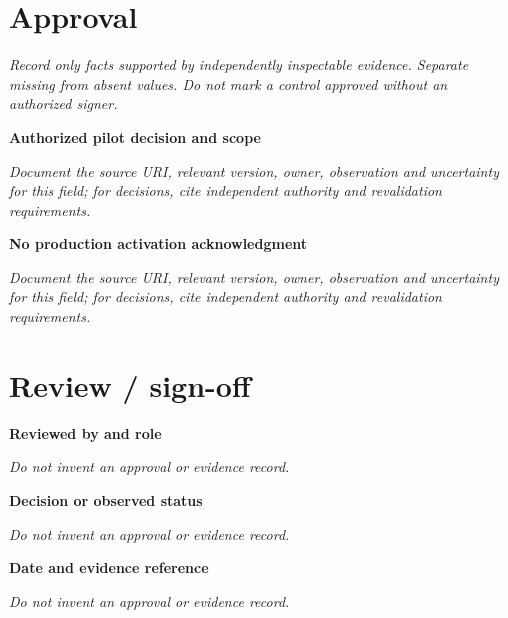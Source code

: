 \documentclass[11pt,letterpaper]{article}
\begin{document}
\section{Approval}
\noindent\emph{Record only facts supported by independently inspectable evidence. Separate missing from absent values. Do not mark a control approved without an authorized signer.}\par
\noindent\textbf{Authorized pilot decision and scope}\par
\noindent\emph{Document the source URI, relevant version, owner, observation and uncertainty for this field; for decisions, cite independent authority and revalidation requirements.}\par\medskip
\noindent\textbf{No production activation acknowledgment}\par
\noindent\emph{Document the source URI, relevant version, owner, observation and uncertainty for this field; for decisions, cite independent authority and revalidation requirements.}\par\medskip
\section{Review / sign-off}
\noindent\textbf{Reviewed by and role}\par
\emph{Do not invent an approval or evidence record.}\par\medskip
\noindent\textbf{Decision or observed status}\par
\emph{Do not invent an approval or evidence record.}\par\medskip
\noindent\textbf{Date and evidence reference}\par
\emph{Do not invent an approval or evidence record.}\par\medskip
\end{document}

